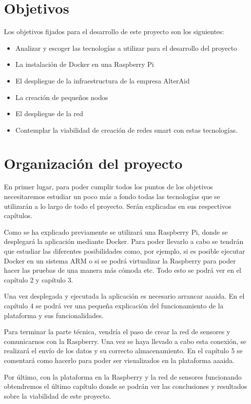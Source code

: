 \section{Objetivos}

Los objetivos fijados para el desarrollo de este proyecto son los siguientes:

\begin{itemize}
\item Analizar y escoger las tecnologías a utilizar para el desarrollo del proyecto
\item La instalación de Docker en una Raspberry Pi
\item El despliegue de la infraestructura de la empresa AlterAid
\item La creación de pequeños nodos
\item El despliegue de la red
\item Contemplar la viabilidad de creación de redes smart con estas tecnologías. 
\end{itemize}

\section{Organización del proyecto}

En primer lugar, para poder cumplir todos los puntos de los objetivos necesitaremos estudiar un poco más a fondo todas las tecnologías que se utilizarán a lo largo de todo el proyecto. Serán explicadas en sus respectivos capítulos.

Como se ha explicado previamente se utilizará una Raspberry Pi, donde se desplegará la aplicación mediante Docker. Para poder llevarlo a cabo se tendrán que estudiar las diferentes posibilidades como, por ejemplo, si es posible ejecutar Docker en un sistema ARM o si se podrá virtualizar la Raspberry para poder hacer las pruebas de una manera más cómoda etc. Todo esto se podrá ver en el capítulo 2 y capítulo 3.

Una vez desplegada y ejecutada la aplicación es necesario arrancar aaaida. En el capítulo 4 se podrá ver una pequeña explicación del funcionamiento de la plataforma y sus funcionalidades. 

Para terminar la parte técnica, vendría el paso de crear la red de sensores y
comunicarnos con la Raspberry. Una vez se haya llevado a cabo esta conexión, se realizará el envío de los datos y su correcto almacenamiento. En el capítulo 5 se comentará como hacerlo para poder ser visualizados en la plataforma aaaida. 

Por último, con la plataforma en la Raspberry y la red de sensores funcionando obtendremos el último capítulo donde se podrán ver las conclusiones y resultados sobre la viabilidad de este proyecto.
